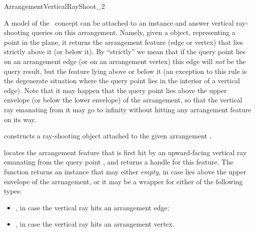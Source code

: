 
\ccRefPageBegin

\begin{ccRefConcept}{ArrangementVerticalRayShoot_2}

\ccDefinition

A model of the \ccRefName\ concept can be attached to an 
instance and answer vertical ray-shooting queries on this arrangement.
Namely, given a  object, representing a point in
the plane, it returns the arrangement feature (edge or vertex) that lies
strictly above it (or below it). By ``strictly'' we mean that if the
query point lies on an arrangement edge (or on an arrangement vertex) this
edge will {\em not} be the query result, but the feature lying above or
below it (an exception to this rule is the degenerate situation where the
query point lies in the interior of a vertical edge). Note that it may happen
that the query point lies above the upper envelope (or below the lower
envelope) of the arrangement, so that the vertical ray emanating from it
may go to infinity without hitting any arrangement feature on its way.

\ccTypes



\ccCreation
{}


  {constructs a ray-shooting object \ccVar{} attached to the given
   arrangement .}

\ccQueryFunctions

  {locates the arrangement feature that is first hit by an upward-facing
   vertical ray emanating from the query point ,
   and returns a handle for this feature.
   The function returns an  instance that may either {\sl empty},
   in case  lies above the upper envelope of the arrnagement, or it
   may be a wrapper for either of the following types:
   \begin{itemize}
   \item {}, in case the vertical
         ray hits an arrangement edge;
   \item {}, in case the vertical
         ray hits an arrangement vertex.
   \end{itemize}
   }


\end{ccRefConcept}
